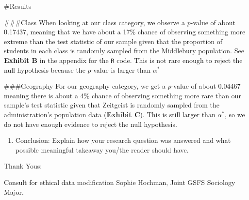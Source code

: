 \documentclass[
]{article}
\providecommand{\tightlist}{%
  \setlength{\itemsep}{0pt}\setlength{\parskip}{0pt}}
\begin{document}
\#Results

\#\#\#Class When looking at our class category, we observe a \(p\)-value
of about 0.17437, meaning that we have about a 17\% chance of observing
something more extreme than the test statistic of our sample given that
the proportion of students in each class is randomly sampled from the
Middlebury population. See \textbf{Exhibit B} in the appendix for the
\texttt{R} code. This is not rare enough to reject the null hypothesis
because the \(p\)-value is larger than \(\alpha^*\)

\#\#\#Geography For our geography category, we get a \(p\)-value of
about 0.04467 meaning there is about a 4\% chance of observing something
more rare than our sample's test statistic given that Zeitgeist is
randomly sampled from the administration's population data
(\textbf{Exhibit C}). This is still larger than \(\alpha^*\), so we do
not have enough evidence to reject the null hypothesis.

\begin{enumerate}
\def\labelenumi{\arabic{enumi})}
\setcounter{enumi}{3}
\tightlist
\item
  Conclusion: Explain how your research question was answered and what
  possible meaningful takeaway you/the reader should have.
\end{enumerate}

Thank Yous:

Consult for ethical data modification Sophie Hochman, Joint GSFS
Sociology Major.
\end{document}
